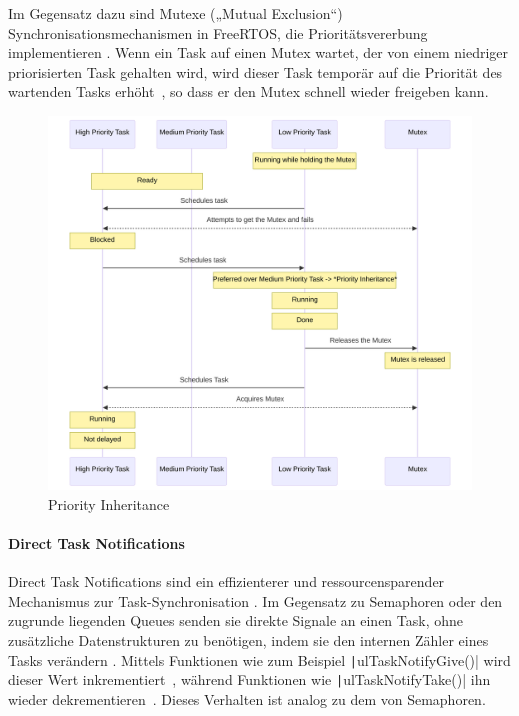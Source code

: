 Im Gegensatz dazu sind Mutexe („Mutual Exclusion“) Synchronisationsmechanismen
in FreeRTOS, die Prioritätsvererbung implementieren \cite{freertos_mutexes}.
Wenn ein Task auf einen Mutex wartet, der von einem niedriger priorisierten Task
gehalten wird, wird dieser Task temporär auf die Priorität des wartenden Tasks
erhöht~\cite{FreertosForumSemphMtx}, so dass er den Mutex schnell wieder
freigeben kann.

\begin{figure}[htb]
    \centering
    \includegraphics[width=1\textwidth]{assets/prio_inheritance}
    \caption{Priority Inheritance}
\end{figure}

\paragraph{Direct Task Notifications}

Direct Task Notifications sind ein effizienterer und ressourcensparender
Mechanismus zur Task-Synchronisation \cite{freertos_task_notifications_desc}. Im
Gegensatz zu Semaphoren oder den zugrunde liegenden Queues senden sie direkte
Signale an einen Task, ohne zusätzliche Datenstrukturen zu benötigen, indem sie
den internen Zähler eines Tasks verändern \cite{freertos_tasks_c_213}. Mittels
Funktionen wie zum Beispiel \texttt|ulTaskNotifyGive()| wird dieser Wert
inkrementiert~\cite{freertos_tasks_c_4296}, während Funktionen wie
\texttt|ulTaskNotifyTake()| ihn wieder
dekrementieren~\cite{freertos_tasks_c_3926}. Dieses Verhalten ist analog zu dem
von Semaphoren.

